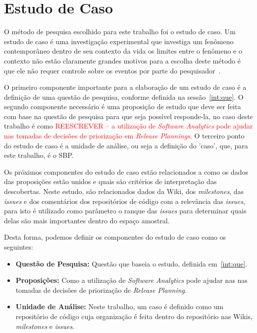 \section{Estudo de Caso}
\label{met:est}
O método de pesquisa escolhido para este trabalho foi o estudo de caso. Um estudo de caso é uma investigação experimental que investiga um fenômeno contemporâneo dentro de seu contexto da vida 
os limites entre o fenômeno e o contexto não estão claramente 
grandes motivos para a escolha deste método é que ele não requer controle sobre os eventos por parte do pesquisador~\cite{yin}.

O primeiro componente importante para a elaboração de um estudo de caso é a definição de uma questão de pesquisa, conforme definida na sessão~\ref{int:que}. O segundo componente necessário é uma proposição de estudo que deve ser feita com base na questão 
de pesquisa para que seja possível responde-la, no caso deste trabalho é como \textcolor{red}{ REESCREVER --
 a utilização de \textit{Software 
Analytics} pode ajudar nas tomadas de decisões de priorização em \textit{Release Plannings}.} O terceiro ponto do estudo de caso é a unidade de análise, ou seja a definição do 'caso',
que, para este trabalho, é o SBP.

Os próximos componentes do estudo de caso estão relacionados a como os dados das
proposições estão unidos e quais são critérios de interpretação das descobertas.
Neste estudo, são relacionados dados da Wiki, dos \textit{milestones}, das \textit{issues} 
e dos comentários dos repositórios de código com a relevância das \textit{issues}, para isto
é utilizado como parâmetro o ranque das \textit{issues} para determinar quais delas 
são mais importantes dentro do espaço amostral.




Desta forma, podemos definir os componentes do estudo de caso como os seguintes:

\begin{itemize}
    \item \textbf{Questão de Pesquisa:} Questão que baseia o estudo, definida em~\ref{int:que}.
    \item \textbf{Proposições:} Como a utilização de \textit{Software Analytics} pode ajudar nas
    nas tomadas de decisões de priorização de \textit{Release Planning}.
    \item \textbf{Unidade de Análise:} Neste trabalho, um caso é definido como um repositório
        de código cuja organização é feita dentro do repositório nas Wikis, \textit{milestones}
        e \textit{issues}.
\end{itemize}




